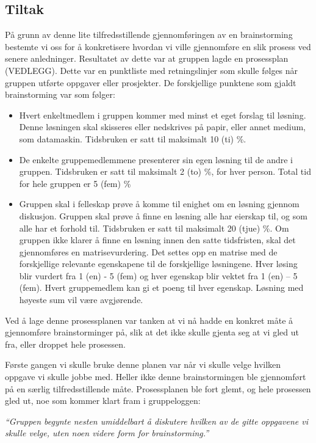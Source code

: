 \subsection{Tiltak}
På grunn av denne lite tilfredsstillende gjennomføringen av en brainstorming bestemte vi oss for å konkretisere hvordan vi ville gjennomføre en slik prosess ved senere anledninger. Resultatet av dette var at gruppen lagde en prosessplan (VEDLEGG). Dette var en punktliste med retningslinjer som skulle følges når gruppen utførte oppgaver eller prosjekter. De forskjellige punktene som gjaldt brainstorming var som følger:
\begin{itemize}
\item Hvert enkeltmedlem i gruppen kommer med minst et eget forslag til løsning. Denne løsningen skal skisseres eller nedskrives på papir, eller annet medium, som datamaskin. Tidsbruken er satt til maksimalt 10 (ti) \%.

\item De enkelte gruppemedlemmene presenterer sin egen løsning til de andre i gruppen. Tidsbruken er satt til maksimalt 2 (to) \%, for hver person. Total tid for hele gruppen er 5 (fem) \%
 
\item Gruppen skal i felleskap prøve å komme til enighet om en løsning gjennom diskusjon. Gruppen skal prøve å finne en løsning alle har eierskap til, og som alle har et forhold til. Tidsbruken er satt til maksimalt 20 (tjue) \%. Om gruppen ikke klarer å finne en løsning innen den satte tidsfristen, skal det gjennomføres en matrisevurdering. Det settes opp en matrise med de forskjellige relevante egenskapene til de forskjellige løsningene. Hver løsing blir vurdert fra 1 (en) - 5 (fem) og hver egenskap blir vektet fra 1 (en) – 5 (fem). Hvert gruppemedlem kan gi et poeng til hver egenskap. Løsning med høyeste sum vil være avgjørende.
\end{itemize}
Ved å lage denne prosessplanen var tanken at vi nå hadde en konkret måte å gjennomføre brainstorminger på, slik at det ikke skulle gjenta seg at vi gled ut fra, eller droppet hele prosessen.

Første gangen vi skulle bruke denne planen var når vi skulle velge hvilken oppgave vi skulle jobbe med. Heller ikke denne brainstormingen ble gjennomført på en særlig tilfredsstillende måte. Prosessplanen ble fort glemt, og hele prosessen gled ut, noe som kommer klart fram i gruppeloggen:\newline

\emph{“Gruppen begynte nesten umiddelbart å diskutere hvilken av de gitte oppgavene vi skulle velge, uten noen videre form for brainstorming.”} \newline

